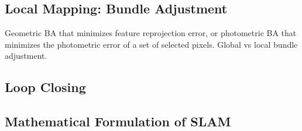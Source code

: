 \documentclass{article}
\begin{document}
  \subsection{Local Mapping: Bundle Adjustment}

  Geometric BA that minimizes feature reprojection error, or photometric BA that minimizes the photometric error of a set of selected pixels. Global vs local bundle adjustment. 

  \subsection{Loop Closing}

  \subsection{Mathematical Formulation of SLAM}
\end{document}
